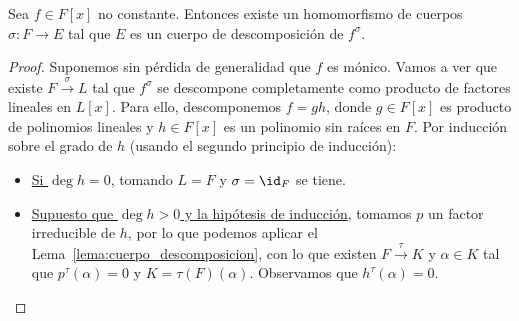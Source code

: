 \begin{prop}\label{prop:existe_cdd}
    Sea $f\in F[x]$ no constante. Entonces existe un homomorfismo de cuerpos $\sigma:F\to E$ tal que $E$ es un cuerpo de descomposición de $f^{\sigma}$.
    \begin{proof}
        Suponemos sin pérdida de generalidad que $f$ es mónico. Vamos a ver que existe $F\stackrel{\sigma}{\to}L$ tal que $f^\sigma$ se descompone completamente como producto de factores lineales en $L[x]$. Para ello, descomponemos $f=gh$, donde $g\in F[x]$ es producto de polinomios lineales y $h\in F[x]$ es un polinomio sin raíces en $F$. Por inducción sobre el grado de $h$ (usando el segundo principio de inducción):
        \begin{itemize}
            \item \underline{Si $\deg h = 0$}, tomando $L = F$ y $\sigma = \id_F$ se tiene.
            \item \underline{Supuesto que $\deg h>0$ y la hipótesis de inducción}, tomamos $p$ un factor irreducible de $h$, por lo que podemos aplicar el Lema~\ref{lema:cuerpo_descomposicion}, con lo que existen $F\stackrel{\tau}{\to}K$ y $\alpha\in K$ tal que $p^\tau(\alpha)=0$ y $K = \tau(F)(\alpha)$. Observamos que $h^\tau(\alpha)=0$.


\end{itemize}
\end{proof}
\end{prop}
